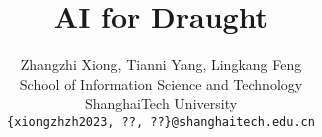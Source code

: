 \documentclass[letterpaper]{article}
\begin{document}
%
\title{AI for Draught}
\author{Zhangzhi Xiong, Tianni Yang, Lingkang Feng\\
School of Information Science and Technology\\
ShanghaiTech University\\
{\tt\small \{xiongzhzh2023, ??, ??\}@shanghaitech.edu.cn}\\
}
\maketitle





\end{document}

